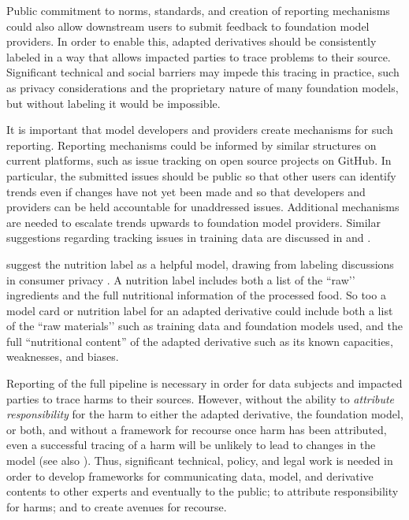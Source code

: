 Public commitment to norms, standards, and creation of reporting mechanisms could also allow downstream users to submit feedback to foundation model providers.
In order to enable this, adapted derivatives should be consistently labeled in a way that allows impacted parties to trace problems to their source. 
Significant technical and social barriers may impede this tracing in practice, such as privacy considerations and the proprietary nature of many foundation models, but without labeling it would be impossible.  

It is important that model developers and providers create mechanisms for such reporting.  Reporting mechanisms could be informed by similar structures on current platforms, such as issue tracking on open source projects on GitHub. In particular, the submitted issues should be public so that other users can identify trends even if changes have not yet been made and so that developers and providers can be held accountable for unaddressed issues. Additional mechanisms are needed to escalate trends upwards to foundation model providers. 
Similar suggestions regarding tracking issues in training data are discussed in \citet{dinan21} and .

\citet{holland2018dataset} suggest 
the nutrition label as a helpful model, drawing from labeling discussions in consumer privacy \citep{kelley2009nutrition}.  A nutrition label includes both a list of the ``raw’’ ingredients and the full nutritional information of the processed food. So too a model card \citep{Mitchell_2019} or nutrition label for an adapted derivative could include both a list of the ``raw materials’’ such as training data and foundation models used, and the full ``nutritional content'' of the adapted derivative such as its known capacities, weaknesses, and biases.  

Reporting of the full pipeline is necessary in order for data subjects and impacted parties to trace harms to their sources. However, without the ability to \textit{attribute responsibility} for the harm to either the adapted derivative, the foundation model, or both, and without a framework for recourse once harm has been attributed, even a successful tracing of a harm will be unlikely to lead to changes in the model (see also ). Thus, significant technical, policy, and legal work is needed in order to develop frameworks for communicating data, model, and derivative contents to other experts and eventually to the public; to attribute responsibility for harms; and to create avenues for recourse. 


